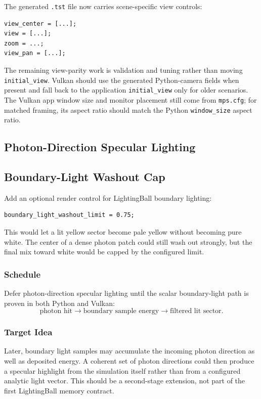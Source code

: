 The generated \texttt{.tst} file now carries scene-specific view controls:
\begin{verbatim}
view_center = [...];
view = [...];
zoom = ...;
view_pan = [...];
\end{verbatim}

The remaining view-parity work is validation and tuning rather than moving
\texttt{initial\_view}.  Vulkan should use the generated Python-camera fields
when present and fall back to the application \texttt{initial\_view} only for
older scenarios.  The Vulkan app window size and monitor placement still come
from \texttt{mps.cfg}; for matched framing, its aspect ratio should match the
Python \texttt{window\_size} aspect ratio.

\subsection{Photon-Direction Specular Lighting}

\subsection{Boundary-Light Washout Cap}

Add an optional render control for LightingBall boundary lighting:
\begin{verbatim}
boundary_light_washout_limit = 0.75;
\end{verbatim}

This would let a lit yellow sector become pale yellow without becoming pure
white.  The center of a dense photon patch could still wash out strongly, but
the final mix toward white would be capped by the configured limit.

\subsubsection{Schedule}

Defer photon-direction specular lighting until the scalar boundary-light path
is proven in both Python and Vulkan:
\[
    \textrm{photon hit}
    \rightarrow
    \textrm{boundary sample energy}
    \rightarrow
    \textrm{filtered lit sector}.
\]

\subsubsection{Target Idea}

Later, boundary light samples may accumulate the incoming photon direction as
well as deposited energy.  A coherent set of photon directions could then
produce a specular highlight from the simulation itself rather than from a
configured analytic light vector.  This should be a second-stage extension,
not part of the first LightingBall memory contract.
